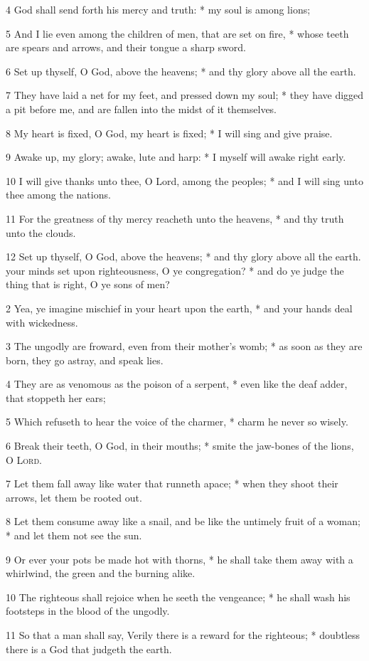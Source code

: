 4 God shall send forth his mercy and truth: * my soul is among lions;\par
5 And I lie even among the children of men, that are set on fire, * whose teeth are spears and arrows, and their tongue a sharp sword.\par
6 Set up thyself, O God, above the heavens; * and thy glory above all the earth.\par
7 They have laid a net for my feet, and pressed down my soul; * they have digged a pit before me, and are fallen into the midst of it themselves.\par
8 My heart is fixed, O God, my heart is fixed; * I will sing and give praise.\par
9 Awake up, my glory; awake, lute and harp: * I myself will awake right early.\par
10 I will give thanks unto thee, O Lord, among the peoples; * and I will sing unto thee among the nations.\par
11 For the greatness of thy mercy reacheth unto the heavens, * and thy truth unto the clouds.\par
12 Set up thyself, O God, above the heavens; * and thy glory above all the earth.
 your minds set upon righteousness, O ye congregation? * and do ye judge the thing that is right, O ye sons of men?\par
2 Yea, ye imagine mischief in your heart upon the earth, * and your hands deal with wickedness.\par
3 The ungodly are froward, even from their mother's womb; * as soon as they are born, they go astray, and speak lies.\par
4 They are as venomous as the poison of a serpent, * even like the deaf adder, that stoppeth her ears;\par
5 Which refuseth to hear the voice of the charmer, * charm he never so wisely.\par
6 Break their teeth, O God, in their mouths; * smite the jaw-bones of the lions, O {\textsc{Lord}}.\par
7 Let them fall away like water that runneth apace; * when they shoot their arrows, let them be rooted out.\par
8 Let them consume away like a snail, and be like the untimely fruit of a woman; * and let them not see the sun.\par
9 Or ever your pots be made hot with thorns, * he shall take them away with a whirlwind, the green and the burning alike.\par
10 The righteous shall rejoice when he seeth the vengeance; * he shall wash his footsteps in the blood of the ungodly.\par
11 So that a man shall say, Verily there is a reward for the righteous; * doubtless there is a God that judgeth the earth.
